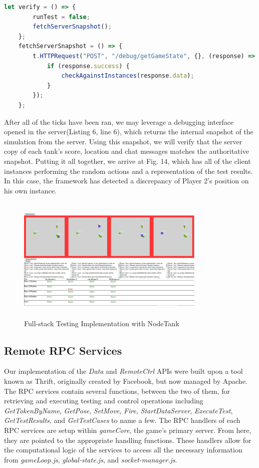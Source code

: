 \documentclass[conference]{IEEEtran}
\begin{document}
\begin{lstlisting}[language=JavaScript,caption={Snippet of Verification Code}]
    let verify = () => {
        runTest = false;
        fetchServerSnapshot();
    };
	fetchServerSnapshot = () => {
        t.HTTPRequest("POST", "/debug/getGameState", {}, (response) => {
            if (response.success) {
                checkAgainstInstances(response.data);
            }
        });
    };
\end{lstlisting}

After all of the ticks have been ran, we may leverage a debugging interface opened in the server(Listing 6, line 6), which returns the internal snapshot of the simulation from the server. 
Using this snapshot, we will verify that the server copy of each tank's score, location and chat messages matches the authoritative snapshot. Putting it all together, we arrive at Fig. 14, which 
has all of the client instances performing the random actions and a representation of the test results. In this case, the framework has detected a discrepancy of Player 2's position on his own
instance. 

\begin{figure}[htbp]
\centerline{\includegraphics [width = 9cm, height = 6cm] {images/FullFullStackTesting.jpg}}
\caption{Full-stack Testing Implementation with NodeTank}
\end{figure}


\subsection{Remote RPC Services}
Our implementation of the \textit{Data} and \textit{RemoteCtrl} APIs were built upon a tool known as Thrift, originally created by Facebook, but now managed by Apache. The RPC services contain several functions, between the two of them, for retrieving and executing testing and control operations including \textit{GetTokenByName}, \textit{GetPose}, \textit{SetMove}, \textit{Fire}, \textit{StartDataServer}, \textit{ExecuteTest}, \textit{GetTestResults}, and \textit{GetTestCases} to name a few. The RPC handlers of each RPC services are setup within \textit{gameCore}, the game's primary server. From here, they are pointed to the appropriate handling functions. These handlers allow for the computational logic of the services to access all the necessary information from \textit{gameLoop.js}, \textit{global-state.js}, and \textit{socket-manager.js}.
\end{document}
